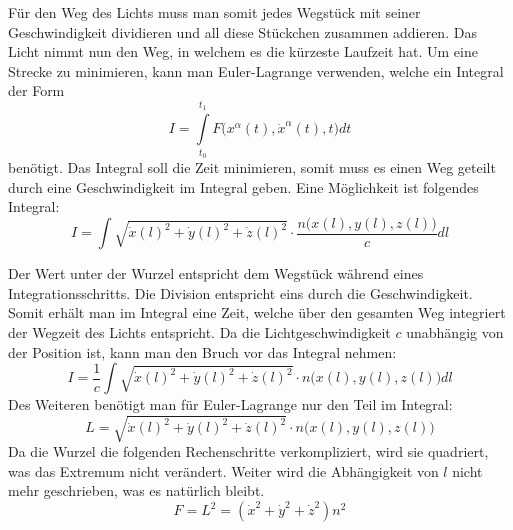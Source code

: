 \begin{refsection}
Für den Weg des Lichts muss man somit jedes Wegstück mit seiner
Geschwindigkeit dividieren und all diese Stückchen zusammen addieren.
Das Licht nimmt nun den Weg, in welchem es die kürzeste Laufzeit hat.
Um eine Strecke zu minimieren, kann man Euler-Lagrange verwenden,
welche ein Integral der Form
\begin{equation*}
  I = \int\limits_{t_0}^{t_1}\! F\bigl(x^{\alpha}(t), \dot{x}^{\alpha}(t),t\bigr)d t
\end{equation*}
benötigt.  Das Integral soll die Zeit minimieren, somit muss es einen
Weg geteilt durch eine Geschwindigkeit im Integral geben.  Eine
Möglichkeit ist folgendes Integral:
\begin{equation}
  I = \int\! \sqrt{\dot{x}(l)^2+\dot{y}(l)^2+\dot{z}(l)^2} \cdot
  \frac{n\bigl(x(l),y(l),z(l)\bigr)}{c} d l
\end{equation}

Der Wert unter der Wurzel entspricht dem Wegstück während eines
Integrationsschritts.  Die Division entspricht eins durch die
Geschwindigkeit.  Somit erhält man im Integral eine Zeit, welche über
den gesamten Weg integriert der Wegzeit des Lichts entspricht.  Da die
Lichtgeschwindigkeit \(c\) unabhängig von der Position ist, kann man
den Bruch vor das Integral nehmen:
\begin{equation}
  I = \frac{1}{c}\int\! \sqrt{\dot{x}(l)^2+\dot{y}(l)^2+\dot{z}(l)^2}
  \cdot n\bigl(x(l),y(l),z(l)\bigr) d l
\end{equation}
Des Weiteren benötigt man für Euler-Lagrange nur den Teil im Integral:
\begin{equation}
  L = \sqrt{\dot{x}(l)^2+\dot{y}(l)^2+\dot{z}(l)^2}
  \cdot n\bigl(x(l),y(l),z(l)\bigr)
\end{equation}
Da die Wurzel die folgenden Rechenschritte verkompliziert, wird sie
quadriert, was das Extremum nicht verändert.  Weiter wird die
Abhängigkeit von \(l\) nicht mehr geschrieben, was es natürlich
bleibt.
\begin{equation}
  F = L^2 = (\dot{x}^2+\dot{y}^2+\dot{z}^2)n^2
\end{equation}


\end{refsection}
